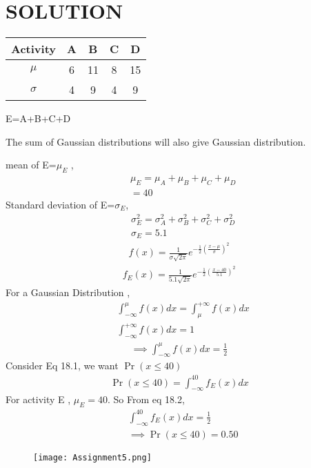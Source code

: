 \documentclass[journal,12pt,twocolumn]{IEEEtran}
\begin{document}
\section*{SOLUTION}
\begin{table}[h!]
\centering
\begin{tabular}{|c||c|c|c|c|}
    \hline
    Activity & A& B& C& D \\
    \hline
    $\mu$ & 6& 11& 8& 15\\[1ex]
    \hline
   $\sigma$ & 4& 9& 4& 9\\[1ex]
    \hline
\end{tabular}
\end{table}
E=A+B+C+D

The sum of Gaussian distributions will also give Gaussian distribution. 

mean of E=$\mu_E$ ,
\begin{align*}
&\mu_E=\mu_A+\mu_B+\mu_C+\mu_D\\
&=40
\end{align*}
Standard deviation of E=$\sigma_E$,
\begin{align*}
&\sigma_E^2=\sigma_A^2+\sigma_B^2+\sigma_C^2+\sigma_D^2\\
&\sigma_E=5.1
\end{align*}
\begin{align*}
f(x)=\frac{1}{\sigma\sqrt{2\pi}}e^{-\frac{1}{2}\left(\frac{x-\mu}{\sigma}\right)^2}
\end{align*}
\begin{align}
\tag{18.1}
f_E(x)=\frac{1}{5.1\sqrt{2\pi}}e^{-\frac{1}{2}\left(\frac{x-40}{5.1}\right)^2}
\end{align}
For a Gaussian Distribution ,
\begin{align*}
&\int_{-\infty}^{\mu}f(x)dx=\int_{\mu}^{+\infty}f(x)dx\\
&\int_{-\infty}^{+\infty}f(x)dx=1
\end{align*}
\begin{align}
\tag{18.2}
\implies\int_{-\infty}^{\mu}f(x)dx=\frac{1}{2}
\end{align}
Consider Eq 18.1, we want $\Pr(x\leq40)$
\begin{align*}
\Pr(x\leq40)=\int_{-\infty}^{40}f_E(x)dx
\end{align*}
For activity E , $\mu_E=40$. So From eq 18.2,
\begin{align*}
&\int_{-\infty}^{40}f_E(x)dx=\frac{1}{2}\\
&\implies\Pr(x\leq40)=0.50
\end{align*}
\begin{figure}[t]
    \centering
    \texttt{[image: Assignment5.png]}
    \label{fig:my_label}
\end{figure}
\end{document}
